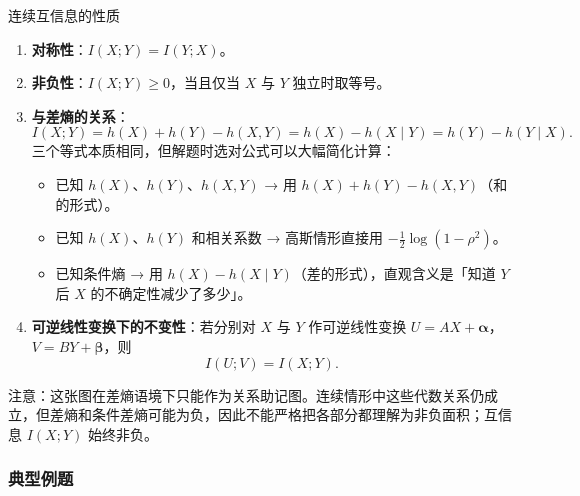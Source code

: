 \begin{formulaBox}{连续互信息的性质}
\begin{enumerate}
  \item \textbf{对称性}：$I(X;Y)=I(Y;X)$。
  \item \textbf{非负性}：$I(X;Y)\ge 0$，当且仅当 $X$ 与 $Y$ 独立时取等号。
  \item \textbf{与差熵的关系}：
  \[
  I(X;Y)=h(X)+h(Y)-h(X,Y)
        =h(X)-h(X\mid Y)=h(Y)-h(Y\mid X).
  \]
  三个等式本质相同，但解题时选对公式可以大幅简化计算：
  \begin{itemize}
    \item 已知 $h(X)$、$h(Y)$、$h(X,Y)$ → 用 $h(X)+h(Y)-h(X,Y)$（和的形式）。
    \item 已知 $h(X)$、$h(Y)$ 和相关系数 → 高斯情形直接用 $-\frac12\log(1-\rho^2)$。
    \item 已知条件熵 → 用 $h(X)-h(X\mid Y)$（差的形式），直观含义是「知道 $Y$ 后 $X$ 的不确定性减少了多少」。
  \end{itemize}
  \item \textbf{可逆线性变换下的不变性}：若分别对 $X$ 与 $Y$ 作可逆线性变换 $U=AX+\bm{\alpha}$，$V=BY+\bm{\beta}$，则
  \[
  I(U;V)=I(X;Y).
  \]
\end{enumerate}
\end{formulaBox}

\begin{center}
\end{center}

\noindent 注意：这张图在差熵语境下只能作为关系助记图。连续情形中这些代数关系仍成立，但差熵和条件差熵可能为负，因此不能严格把各部分都理解为非负面积；互信息 $I(X;Y)$ 始终非负。

\subsubsection{典型例题}

